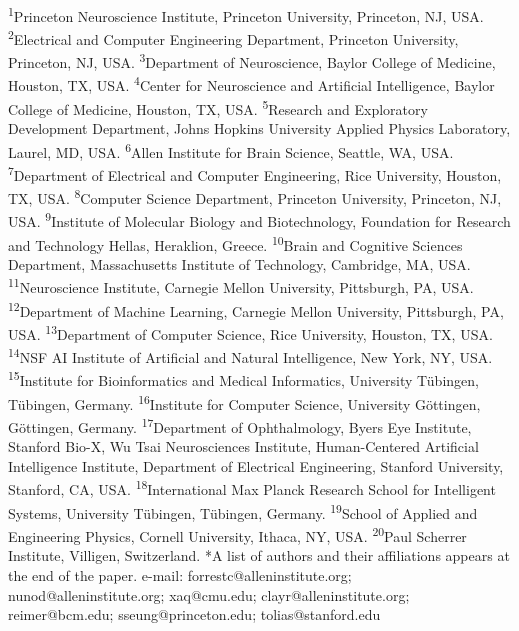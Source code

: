 \documentclass{article}
\begin{document}
{\footnotesize \textsuperscript{1}Princeton Neuroscience Institute, Princeton University, Princeton, NJ, USA. \textsuperscript{2}Electrical and Computer Engineering Department, Princeton University, Princeton, NJ, USA. \textsuperscript{3}Department of Neuroscience, Baylor College of Medicine, Houston, TX, USA. \textsuperscript{4}Center for Neuroscience and Artificial Intelligence, Baylor College of Medicine, Houston, TX, USA. \textsuperscript{5}Research and Exploratory Development Department, Johns Hopkins University Applied Physics Laboratory, Laurel, MD, USA. \textsuperscript{6}Allen Institute for Brain Science, Seattle, WA, USA. \textsuperscript{7}Department of Electrical and Computer Engineering, Rice University, Houston, TX, USA. \textsuperscript{8}Computer Science Department, Princeton University, Princeton, NJ, USA. \textsuperscript{9}Institute of Molecular Biology and Biotechnology, Foundation for Research and Technology Hellas, Heraklion, Greece. \textsuperscript{10}Brain and Cognitive Sciences Department, Massachusetts Institute of Technology, Cambridge, MA, USA. \textsuperscript{11}Neuroscience Institute, Carnegie Mellon University, Pittsburgh, PA, USA. \textsuperscript{12}Department of Machine Learning, Carnegie Mellon University, Pittsburgh, PA, USA. \textsuperscript{13}Department of Computer Science, Rice University, Houston, TX, USA. \textsuperscript{14}NSF AI Institute of Artificial and Natural Intelligence, New York, NY, USA. \textsuperscript{15}Institute for Bioinformatics and Medical Informatics, University Tübingen, Tübingen, Germany. \textsuperscript{16}Institute for Computer Science, University Göttingen, Göttingen, Germany. \textsuperscript{17}Department of Ophthalmology, Byers Eye Institute, Stanford Bio-X, Wu Tsai Neurosciences Institute, Human-Centered Artificial Intelligence Institute, Department of Electrical Engineering, Stanford University, Stanford, CA, USA. \textsuperscript{18}International Max Planck Research School for Intelligent Systems, University Tübingen, Tübingen, Germany. \textsuperscript{19}School of Applied and Engineering Physics, Cornell University, Ithaca, NY, USA. \textsuperscript{20}Paul Scherrer Institute, Villigen, Switzerland. *A list of authors and their affiliations appears at the end of the paper. e-mail: forrestc@alleninstitute.org; nunod@alleninstitute.org; xaq@cmu.edu; clayr@alleninstitute.org; reimer@bcm.edu; sseung@princeton.edu; tolias@stanford.edu}
\end{document}
